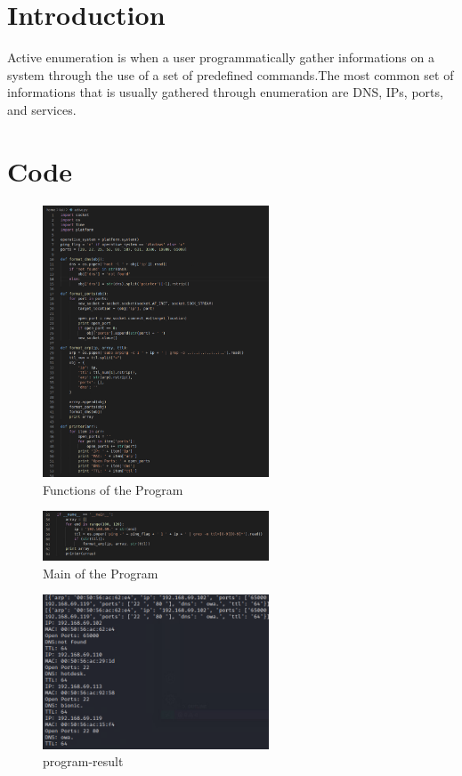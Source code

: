 \section{Introduction}
\label{s:lab2-introduction}
Active enumeration is when a user programmatically gather informations on a system through
the use of a set of predefined commands.The most common set of informations that is
usually gathered through enumeration are DNS, IPs, ports, and services.

\section{Code}
\label{s:lab2-code}
\begin{figure}[H]
  \centering
  \includegraphics[width=0.6\textwidth]{figures/code/functions}
  \caption{Functions of the Program}
  \label{f:functions}
\end{figure}

\begin{figure}[H]
  \centering
  \includegraphics[width=0.6\textwidth]{figures/code/main}
  \caption{Main of the Program}
  \label{f:main}
\end{figure}

\begin{figure}[H]
  \centering
  \includegraphics[width=0.6\textwidth]{figures/program-result}
  \caption{program-result}
  \label{f:program-result}
\end{figure}
